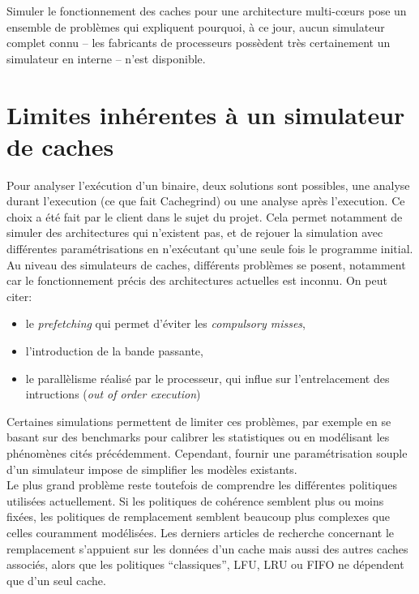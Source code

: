 Simuler le fonctionnement des caches pour une architecture multi-c{\oe}urs pose un ensemble de problèmes qui expliquent pourquoi, à ce jour, aucun simulateur complet connu -- les fabricants de processeurs possèdent très certainement un simulateur en interne -- n'est disponible. 

\section{Limites inhérentes à un simulateur de caches}
Pour analyser l'exécution d'un binaire, deux solutions sont possibles, une analyse durant l'execution (ce que fait \textsf{Cachegrind}) ou une analyse après l'execution. Ce choix a été fait par le client dans le sujet du projet. Cela permet notamment de simuler des architectures qui n'existent pas, et de rejouer la simulation avec différentes paramétrisations en n'exécutant qu'une seule fois le programme initial. \\

Au niveau des simulateurs de caches, différents problèmes se posent, notamment car le fonctionnement précis des architectures actuelles est inconnu. On peut citer:
\begin{itemize}
\item le \emph{prefetching} qui permet d'éviter les \emph{compulsory misses}, 
\item l'introduction de la bande passante, 
\item le parallèlisme réalisé par le processeur, qui influe sur l'entrelacement des intructions (\emph{out of order execution}) \\
\end{itemize}

Certaines simulations permettent de limiter ces problèmes, par exemple en se basant sur des benchmarks pour calibrer les statistiques ou en modélisant les phénomènes cités précédemment. Cependant, fournir une paramétrisation souple d'un simulateur impose de simplifier les modèles existants. \\

Le plus grand problème reste toutefois de comprendre les différentes politiques utilisées actuellement. Si les politiques de cohérence semblent plus ou moins fixées, les politiques de remplacement semblent beaucoup plus complexes que celles couramment modélisées. Les derniers articles de recherche concernant le remplacement s'appuient sur les données d'un cache mais aussi des autres caches associés, alors que les politiques ``classiques'', LFU, LRU ou FIFO ne dépendent que d'un seul cache.

